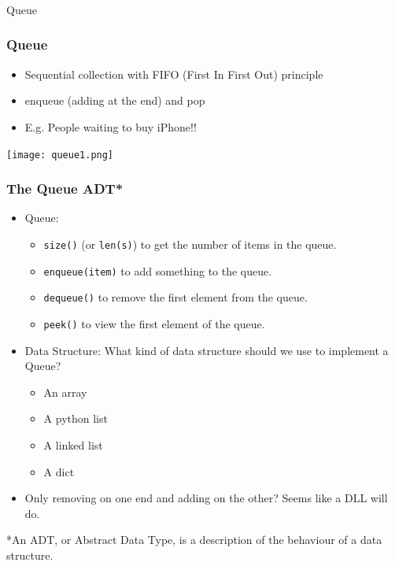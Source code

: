 \begin{frame}[fragile]\frametitle{}
\begin{center}
{\Large Queue}
\end{center}

\end{frame}

\begin{frame}
	\frametitle{Queue}
		\begin{itemize}
		\item Sequential collection with FIFO (First In First Out) principle
		\item enqueue (adding at the end) and pop
		\item E.g. People waiting to buy iPhone!!
		\end{itemize}
		
\begin{center}
\texttt{[image: queue1.png]}
\end{center}

\end{frame}

\begin{frame}
	\frametitle{The Queue ADT*}
	
			\begin{itemize}

				\item Queue:
								\begin{itemize}

				\item \texttt{size()} (or \texttt{len(s)}) to get the number of items in the queue.
				\item \texttt{enqueue(item)} to add something to the queue.
				\item \texttt{dequeue()} to remove the first element from the queue.
				\item \texttt{peek()} to view the first element of the queue.
			\end{itemize}
			\item Data Structure:
			What kind of data structure should we use to implement a Queue?
				\begin{itemize}
					\item An array
					\item A python list
					\item A linked list
					\item A dict
				\end{itemize}
			\item 
			Only removing on one end and adding on the other? Seems like a DLL will do.
				\end{itemize}

						{*\scriptsize An ADT, or Abstract Data Type, is a description of the behaviour of a data structure.}
\end{frame}

